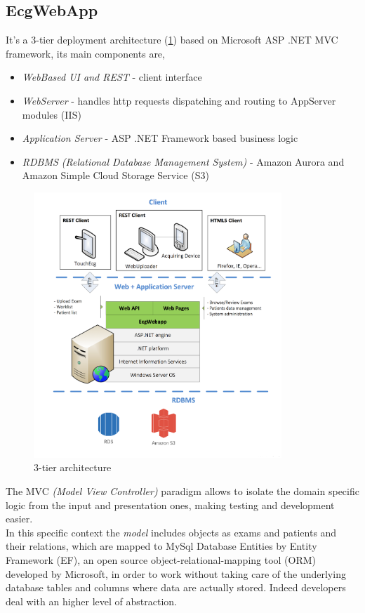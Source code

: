 \subsection{EcgWebApp}
\label{subsection:ecgwebapp}
It's a 3-tier deployment architecture (\ref{fig:tiers_diagram}) based on Microsoft ASP .NET MVC framework, its main components are,
\begin{itemize}
    \item \textit{WebBased UI and REST} - client interface
    \item \textit{WebServer} - handles http requests dispatching and routing to AppServer modules (IIS)
    \item \textit{Application Server} - ASP .NET Framework based business logic
    \item \textit{RDBMS (Relational Database Management System)} - Amazon Aurora and Amazon Simple Cloud Storage Service (S3)
\end{itemize}
\begin{figure}
    \includegraphics[width=\textwidth,height=10cm,keepaspectratio]{img/tiers_diagram}
    \caption{3-tier architecture}
    \label{fig:tiers_diagram}
\end{figure}
The MVC \textit{(Model View Controller)} paradigm allows to isolate the domain specific logic from the input and presentation ones, making testing and development easier. \cite{mvc}\\
In this specific context the \textit{model} includes objects as exams and patients and their relations, which are mapped to MySql Database Entities by Entity Framework (EF), an open source object-relational-mapping tool (ORM) developed by Microsoft, in order to work without taking care of the underlying database tables and columns where data are actually stored. Indeed developers deal with an higher level of abstraction. \cite{wikipedia_ef}
